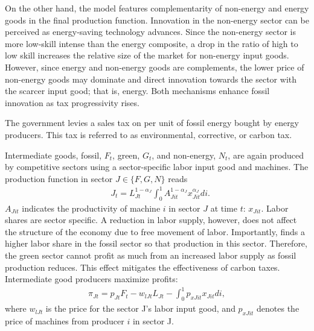 On the other hand, the model features complementarity of non-energy and energy goods in the final production function. Innovation in the non-energy sector can be perceived as energy-saving technology advances. Since the non-energy sector is more low-skill intense than the energy composite, a drop in the ratio of high to low skill increases the relative size of the market for non-energy input goods. However, since energy and non-energy goods are complements, the lower price of non-energy goods may dominate and direct innovation towards the sector with the scarcer input good; that is, energy.
Both mechanisms enhance fossil innovation as tax progressivity rises. 

The government levies a sales tax on per unit of fossil energy bought by energy producers. This tax is referred to as environmental, corrective, or carbon tax. 

Intermediate goods, fossil, $F_t$, green, $G_t$, and non-energy, $N_t$, are again produced by competitive sectors using a sector-specific labor input good and machines. The production function in sector $J\in \{F,G,N\}$ reads
\begin{align}
&J_{t}= L_{Jt}^{1-\alpha_J}\int_{0}^{1}A_{Jit}^{1-\alpha_J}x_{Jit}^{\alpha_J} di.
\end{align}
$A_{Jit}$ indicates the productivity of machine $i$ in sector $J$ at time $t$: $x_{Jit}$. 
Labor shares are sector specific. A reduction in labor supply, however, does not affect the structure of the economy due to free movement of labor. 
Importantly, 
\cite{Fried2018ClimateAnalysis} finds a higher labor share in the fossil sector so that production in this sector. 
Therefore, the green sector cannot profit as much from an increased labor supply as fossil production reduces. This effect mitigates the effectiveness of carbon taxes. 
Intermediate good producers maximize profits: 
\begin{align}
\pi_{Jt}=p_{Jt}F_t-w_{lJt}L_{Jt}-\int_{0}^{1}p_{xJit}x_{Jit}di,
\end{align}
where $w_{lJt}$ is the price for the sector J's labor input good, and $p_{xJit}$ denotes the price of machines from producer $i$ in sector J. 

